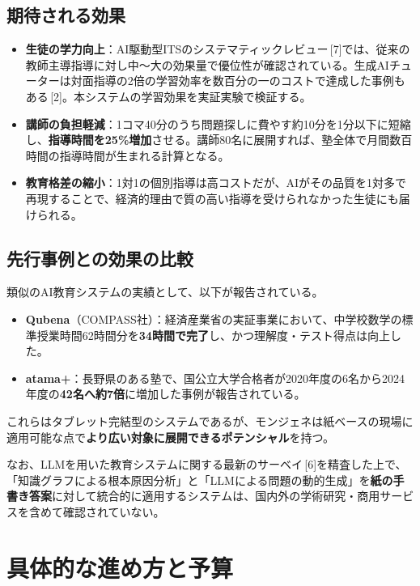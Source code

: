 \documentclass[paper=a4,fontsize=10.5bp,jafontsize=10.5bp]{jlreq}
\begin{document}
\subsection{期待される効果}

\begin{itemize}
  \item \textbf{生徒の学力向上}：AI駆動型ITSのシステマティックレビュー\,[7]では、従来の教師主導指導に対し中〜大の効果量で優位性が確認されている。生成AIチューターは対面指導の2倍の学習効率を数百分の一のコストで達成した事例もある\,[2]。本システムの学習効果を実証実験で検証する。
  \item \textbf{講師の負担軽減}：1コマ40分のうち問題探しに費やす約10分を1分以下に短縮し、\textbf{指導時間を25\%増加}させる。講師80名に展開すれば、塾全体で月間数百時間の指導時間が生まれる計算となる。
  \item \textbf{教育格差の縮小}：1対1の個別指導は高コストだが、AIがその品質を1対多で再現することで、経済的理由で質の高い指導を受けられなかった生徒にも届けられる。
\end{itemize}

\subsection{先行事例との効果の比較}

類似のAI教育システムの実績として、以下が報告されている。
\begin{itemize}
  \item \textbf{Qubena}（COMPASS社）：経済産業省の実証事業において、中学校数学の標準授業時間62時間分を\textbf{34時間で完了}し、かつ理解度・テスト得点は向上した。
  \item \textbf{atama+}：長野県のある塾で、国公立大学合格者が2020年度の6名から2024年度の\textbf{42名へ約7倍}に増加した事例が報告されている。
\end{itemize}

これらはタブレット完結型のシステムであるが、モンジェネは紙ベースの現場に適用可能な点で\textbf{より広い対象に展開できるポテンシャル}を持つ。

なお、LLMを用いた教育システムに関する最新のサーベイ\,[6]を精査した上で、「知識グラフによる根本原因分析」と「LLMによる問題の動的生成」を\textbf{紙の手書き答案}に対して統合的に適用するシステムは、国内外の学術研究・商用サービスを含めて確認されていない。

\section{具体的な進め方と予算}
\end{document}
